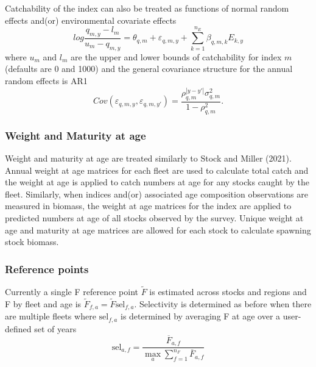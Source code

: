 \documentclass[
]{article}
\begin{document}
Catchability of the index can also be treated as functions of normal
random effects and(or) environmental covariate effects
\[log \frac{q_{m,y}-l_m}{u_m-q_{m,y}} = \theta_{q,m} + \varepsilon_{q,m,y}  + \sum^{n_E}_{k=1} \beta_{q,m,k} E_{k,y}\]
where \(u_{m}\) and \(l_{m}\) are the upper and lower bounds of
catchability for index \(m\) (defaults are 0 and 1000) and the general
covariance structure for the annual random effects is AR1
\[Cov\left(\varepsilon_{q,m,y},\varepsilon_{q,m,y'}\right) =   \frac{\rho_{q,m}^{|y-y'|}\sigma^2_{q,m}}{1 - \rho_{q,m}^2}.\]

\hypertarget{weight-and-maturity-at-age}{%
\subsubsection*{Weight and Maturity at
age}\label{weight-and-maturity-at-age}}

Weight and maturity at age are treated similarly to Stock and Miller
(2021). Annual weight at age matrices for each fleet are used to
calculate total catch and the weight at age is applied to catch numbers
at age for any stocks caught by the fleet. Similarly, when indices
and(or) associated age composition observations are measured in biomass,
the weight at age matrices for the index are applied to predicted
numbers at age of all stocks observed by the survey. Unique weight at
age and maturity at age matrices are allowed for each stock to calculate
spawning stock biomass.

\hypertarget{reference-points}{%
\subsubsection*{Reference points}\label{reference-points}}

Currently a single F reference point \(\widetilde F\) is estimated
across stocks and regions and F by fleet and age is
\(\widetilde F_{f,a} = \widetilde F \text{sel}_{f,a}\). Selectivity is
determined as before when there are multiple fleets where
\(\text{sel}_{f,a}\) is determined by averaging F at age over a
user-defined set of years \begin{equation*}
  \text{sel}_{a,f} = \frac{\overline F_{a,f}}{\max_a \sum^{n_F}_{f=1}{\overline F}_{a,f}}
\end{equation*}
\end{document}
